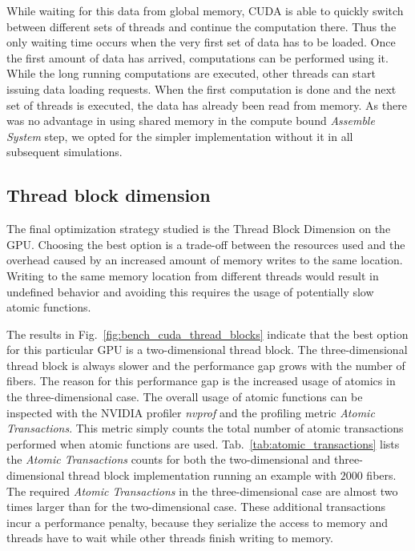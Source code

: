 While waiting for this data from global memory, CUDA is able to quickly switch between different sets of threads and continue the computation there. Thus the only waiting time occurs when the very first set of data has to be loaded. Once the first amount of data has arrived, computations can be performed using it. While the long running computations are executed, other threads can start issuing data loading requests. When the first computation is done and the next set of threads is executed, the data has already been read from memory. As there was no advantage in using shared memory in the compute bound \emph{Assemble System} step, we opted for the simpler implementation without it in all subsequent simulations.

\subsection{Thread block dimension}
\label{subsec:bench_thread_block}

The final optimization strategy studied is the Thread Block Dimension on the GPU. Choosing the best option is a trade-off between the resources used and the overhead caused by an increased amount of memory writes to the same location. Writing to the same memory location from different threads would result in undefined behavior and avoiding this requires the usage of potentially slow atomic functions.

The results in Fig.~\ref{fig:bench_cuda_thread_blocks} indicate that the best option for this particular GPU is a two-dimensional thread block. The three-dimensional thread block is always slower and the performance gap grows with the number of fibers. The reason for this performance gap is the increased usage of atomics in the three-dimensional case. The overall usage of atomic functions can be inspected with the NVIDIA profiler \emph{nvprof} and the profiling metric \emph{Atomic Transactions}. This metric simply counts the total number of atomic transactions performed when atomic functions are used. Tab.~\ref{tab:atomic_transactions} lists the \emph{Atomic Transactions} counts for both the two-dimensional and three-dimensional thread block implementation running an example with $2000$ fibers. The required \emph{Atomic Transactions} in the three-dimensional case are almost two times larger than for the two-dimensional case. These additional transactions incur a performance penalty, because they serialize the access to memory and threads have to wait while other threads finish writing to memory.

